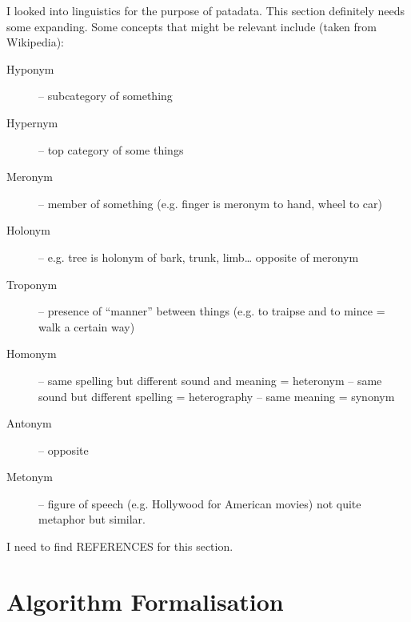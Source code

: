 I looked into linguistics for the purpose of patadata. This section definitely needs some expanding. Some concepts that might be relevant include (taken from Wikipedia):

\begin{description}
  \item [Hyponym] – subcategory of something
  \item [Hypernym] – top category of some things
  \item [Meronym] – member of something (e.g. finger is meronym to hand, wheel to car)
  \item [Holonym] – e.g. tree is holonym of bark, trunk, limb… opposite of meronym
  \item [Troponym] – presence of “manner” between things (e.g. to traipse and to mince = walk a certain way)
  \item [Homonym] – same spelling but different sound and meaning = heteronym – same sound but different spelling = heterography – same meaning = synonym
  \item [Antonym] – opposite
  \item [Metonym] – figure of speech (e.g. Hollywood for American movies) not quite metaphor but similar.
\end{description}

I need to find REFERENCES for this section.







\section{Algorithm Formalisation}

